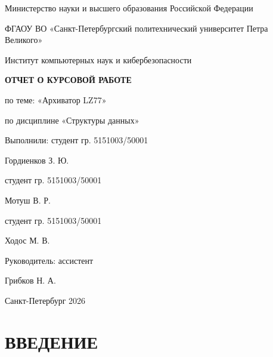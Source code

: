 \documentclass[a4paper,14pt]{extreport}
\begin{document}
\begin{titlepage}
\centering
{\normalsize Министерство науки и высшего образования Российской Федерации\par}
{\normalsize ФГАОУ ВО «Санкт-Петербургский политехнический университет Петра Великого»\par}
{\normalsize Институт компьютерных наук и кибербезопасности\par}
\vspace{1cm}
{\Large\bfseries ОТЧЕТ О КУРСОВОЙ РАБОТЕ\par}
\vspace{0.5cm}
{\large по теме: «Архиватор LZ77»\par}
\vspace{0.5cm}
{\normalsize по дисциплине «Структуры данных»\par}
\vspace{2cm}
\begin{flushright}
{\normalsize Выполнили: студент гр. 5151003/50001\par}
{\normalsize Гордиенков З. Ю.\par}
{\normalsize студент гр. 5151003/50001\par}
{\normalsize Мотуш В. Р.\par}
{\normalsize студент гр. 5151003/50001\par}
{\normalsize Ходос М. В.\par}
\vspace{0.5cm}
{\normalsize Руководитель: ассистент\par}
{\normalsize Грибков Н. А.\par}
\end{flushright}
\vfill
{\large Санкт-Петербург 2026\par}
\end{titlepage}

\setcounter{page}{2}
\tableofcontents
\newpage

\chapter*{ВВЕДЕНИЕ}
\end{document}
